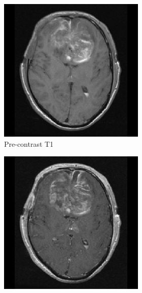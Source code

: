 \begin{figure}[htbp]
\centering
\begin{subfigure}[b]{\textwidth}
    \centering
    \hfill
    \begin{subfigure}[b]{0.24\textwidth}
    \includegraphics[width=\textwidth, clip, trim=2.5cm 0.5cm 2.5cm 0.5cm]{Figures/TCGA-DU-6410_T1.png}
    \caption*{Pre-contrast \acrshort{T1}}
    \end{subfigure}
    \hfill
    \begin{subfigure}[b]{0.24\textwidth}
    \includegraphics[width=\textwidth, clip, trim=2.5cm 0.5cm 2.5cm 0.5cm]{Figures/TCGA-DU-6410_T1GD.png}

\end{subfigure}
\end{subfigure}
\end{figure}
